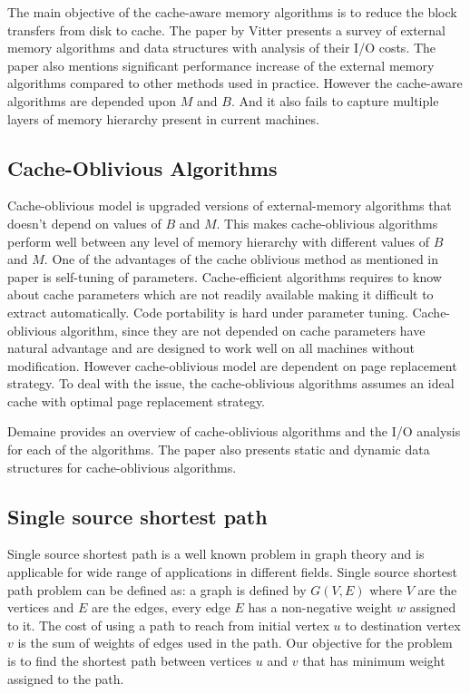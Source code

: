\documentclass[final,3p]{CSP}
\begin{document}
    The main objective of the cache-aware memory algorithms is to reduce the block transfers from disk to cache. The paper by Vitter\cite{vitter2008algorithms} presents a survey of external memory algorithms and data structures with analysis of their I/O costs. The paper also mentions significant performance increase of the external memory algorithms compared to other methods used in practice. However the cache-aware algorithms are depended upon $M$ and $B$. And it also fails to capture multiple layers of memory hierarchy present in current machines.

    \subsection{Cache-Oblivious Algorithms}
    Cache-oblivious model is upgraded versions of external-memory algorithms that doesn't depend on values of $B$ and $M$. This makes cache-oblivious algorithms perform well between any level of memory hierarchy with different values of $B$ and $M$. One of the advantages of the cache oblivious method as mentioned in \cite{demaine2002cache} paper is self-tuning of parameters. Cache-efficient algorithms requires to know about cache parameters which are not readily available making it difficult to extract automatically. Code portability is hard under parameter tuning. Cache-oblivious algorithm, since they are not depended on cache parameters have natural advantage and are designed to work well on all machines without modification.
    However cache-oblivious model are dependent on page replacement strategy. To deal with the issue, the cache-oblivious algorithms assumes an ideal cache with optimal page replacement strategy.

    Demaine\cite{demaine2002cache} provides an overview of cache-oblivious algorithms and the I/O analysis for each of the algorithms. The paper also presents static and dynamic data structures for cache-oblivious algorithms.

    \subsection{Single source shortest path}
    Single source shortest path is a well known problem in graph theory and is applicable for wide range of applications in different fields. Single source shortest path problem can be defined as: a graph is defined by $G(V, E)$ where $V$ are the vertices and $E$ are the edges, every edge $E$ has a non-negative weight $w$ assigned to it. The cost of using a path to reach from initial vertex $u$ to destination vertex $v$ is the sum of weights of edges used in the path. Our objective for the problem is to find the shortest path between vertices $u$ and $v$ that has minimum weight assigned to the path.
\end{document}
